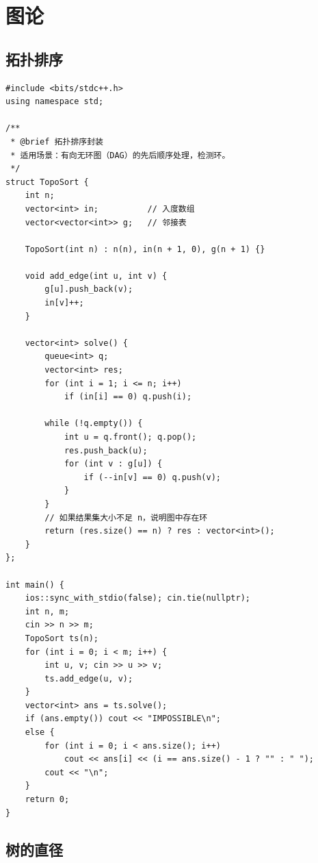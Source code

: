 \section{图论}

\subsection{拓扑排序}

\begin{lstlisting}
#include <bits/stdc++.h>
using namespace std;

/**
 * @brief 拓扑排序封装
 * 适用场景：有向无环图（DAG）的先后顺序处理，检测环。
 */
struct TopoSort {
    int n;
    vector<int> in;          // 入度数组
    vector<vector<int>> g;   // 邻接表

    TopoSort(int n) : n(n), in(n + 1, 0), g(n + 1) {}

    void add_edge(int u, int v) {
        g[u].push_back(v);
        in[v]++;
    }

    vector<int> solve() {
        queue<int> q;
        vector<int> res;
        for (int i = 1; i <= n; i++)
            if (in[i] == 0) q.push(i);

        while (!q.empty()) {
            int u = q.front(); q.pop();
            res.push_back(u);
            for (int v : g[u]) {
                if (--in[v] == 0) q.push(v);
            }
        }
        // 如果结果集大小不足 n，说明图中存在环
        return (res.size() == n) ? res : vector<int>();
    }
};

int main() {
    ios::sync_with_stdio(false); cin.tie(nullptr);
    int n, m;
    cin >> n >> m;
    TopoSort ts(n);
    for (int i = 0; i < m; i++) {
        int u, v; cin >> u >> v;
        ts.add_edge(u, v);
    }
    vector<int> ans = ts.solve();
    if (ans.empty()) cout << "IMPOSSIBLE\n";
    else {
        for (int i = 0; i < ans.size(); i++) 
            cout << ans[i] << (i == ans.size() - 1 ? "" : " ");
        cout << "\n";
    }
    return 0;
}
\end{lstlisting}

\subsection{树的直径}

